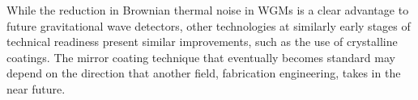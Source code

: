 While the reduction in Brownian thermal noise in \glspl{WGM} is a clear advantage to future gravitational wave detectors, other technologies at similarly early stages of technical readiness present similar improvements, such as the use of crystalline coatings. The mirror coating technique that eventually becomes standard may depend on the direction that another field, fabrication engineering, takes in the near future.
